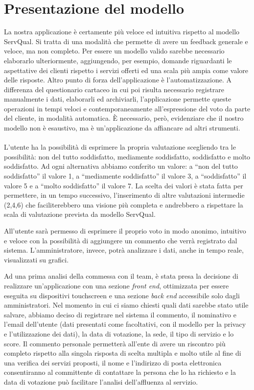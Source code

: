 \newpage
\section{Presentazione del modello}
La nostra applicazione è certamente più veloce ed intuitiva rispetto al modello
ServQual. Si tratta di una modalità che
permette di avere un feedback generale e veloce, ma non completo. Per essere un modello
valido sarebbe necessario elaborarlo ulteriormente, aggiungendo, per esempio,
domande riguardanti le aspettative dei clienti rispetto i servizi offerti ed una
scala più ampia come valore delle risposte.
Altro punto di forza dell'applicazione è l'automatizzazione. A
differenza del questionario cartaceo in cui poi risulta necessario registrare
manualmente i dati, elaborarli ed archiviarli, l'applicazione permette queste
operazioni in tempi veloci e contemporaneamente all'espressione del voto da
parte del cliente, in modalità automatica.
È necessario, però, evidenziare che il nostro modello non è esaustivo, ma è
un'applicazione da affiancare ad altri strumenti. 
\\\\
L'utente ha la possibilità di esprimere la propria valutazione scegliendo tra le
possibilità: non del tutto soddisfatto, mediamente soddisfatto, soddisfatto e
molto soddisfatto. Ad ogni alternativa abbiamo conferito un valore: a ``non del tutto
soddisfatto'' il valore 1, a ``mediamente soddisfatto'' il valore 3, a
``soddisfatto'' il valore 5 e a ``molto soddisfatto'' il valore 7. La scelta dei
valori è stata fatta per permettere, in un tempo successivo, l'inserimento di
altre valutazioni intermedie (2,4,6) che faciliterebbero una visione più
completa e andrebbero a rispettare la scala di valutazione prevista da modello
ServQual.

All'utente sarà permesso di esprimere il proprio voto in modo anonimo,
intuitivo e veloce con la possibilità di aggiungere un commento che verrà
registrato dal sistema. L'amministratore, invece, potrà analizzare i dati, anche
in tempo reale, visualizzati su grafici. 

Ad una prima analisi della commessa con
il team, è stata presa la decisione di realizzare un'applicazione con una
sezione \emph{front end}, ottimizzata per essere eseguita su dispositivi
touchscreen e una sezione \emph{back end} accessibile solo dagli amministratori.
Nel momento in cui ci siamo chiesti quali dati sarebbe stato utile salvare,
abbiamo deciso di registrare nel sistema il commento, il nominativo e l'email
dell'utente (dati presentati come facoltativi, con il modello per la privacy e
l'utilizzazione dei dati), la data di votazione, la
sede, il tipo di servizio e lo score. Il commento personale
permetterà all'ente di avere un riscontro più completo rispetto alla singola
risposta di scelta multipla e molto utile al fine di una verifica dei servizi
proposti, il nome e l'indirizzo di posta elettronica consentiranno al
committente di contattare la persona che lo ha richiesto e la data di votazione
può facilitare l'analisi dell'affluenza al servizio.
